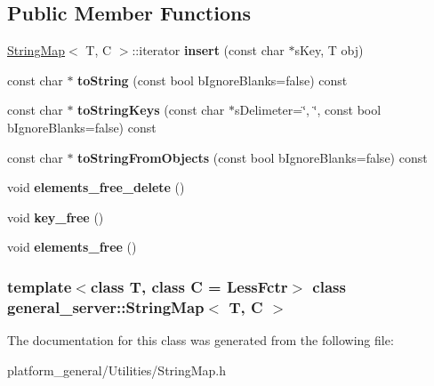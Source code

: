 \subsection*{\-Public \-Member \-Functions}
\begin{DoxyCompactItemize}
\item 
\hypertarget{classgeneral__server_1_1StringMap_aeafd999a8a89f51213e46fe9b78eda53}{\hyperlink{classgeneral__server_1_1StringMap}{\-String\-Map}$<$ \-T, \-C $>$\-::iterator {\bfseries insert} (const char $\ast$s\-Key, \-T obj)}\label{classgeneral__server_1_1StringMap_aeafd999a8a89f51213e46fe9b78eda53}

\item 
\hypertarget{classgeneral__server_1_1StringMap_a09a42eb44f1329b074239f7540073686}{const char $\ast$ {\bfseries to\-String} (const bool b\-Ignore\-Blanks=false) const }\label{classgeneral__server_1_1StringMap_a09a42eb44f1329b074239f7540073686}

\item 
\hypertarget{classgeneral__server_1_1StringMap_ae866721e728d45b969d30d9a79e62602}{const char $\ast$ {\bfseries to\-String\-Keys} (const char $\ast$s\-Delimeter=\char`\"{}, \char`\"{}, const bool b\-Ignore\-Blanks=false) const }\label{classgeneral__server_1_1StringMap_ae866721e728d45b969d30d9a79e62602}

\item 
\hypertarget{classgeneral__server_1_1StringMap_ad8d7e1fd25f63bb9559d1234bc34b632}{const char $\ast$ {\bfseries to\-String\-From\-Objects} (const bool b\-Ignore\-Blanks=false) const }\label{classgeneral__server_1_1StringMap_ad8d7e1fd25f63bb9559d1234bc34b632}

\item 
\hypertarget{classgeneral__server_1_1StringMap_ae161dc0edd948a5d6a4e393ed961a014}{void {\bfseries elements\-\_\-free\-\_\-delete} ()}\label{classgeneral__server_1_1StringMap_ae161dc0edd948a5d6a4e393ed961a014}

\item 
\hypertarget{classgeneral__server_1_1StringMap_a55c4f42af39cc1d23ac630f480ec9e60}{void {\bfseries key\-\_\-free} ()}\label{classgeneral__server_1_1StringMap_a55c4f42af39cc1d23ac630f480ec9e60}

\item 
\hypertarget{classgeneral__server_1_1StringMap_ac5b4a7b12a6d793141ff5cb93c3eb7de}{void {\bfseries elements\-\_\-free} ()}\label{classgeneral__server_1_1StringMap_ac5b4a7b12a6d793141ff5cb93c3eb7de}

\end{DoxyCompactItemize}
\subsubsection*{template$<$class \-T, class \-C = \-Less\-Fctr$>$ class general\-\_\-server\-::\-String\-Map$<$ T, C $>$}



\-The documentation for this class was generated from the following file\-:\begin{DoxyCompactItemize}
\item 
platform\-\_\-general/\-Utilities/\-String\-Map.\-h\end{DoxyCompactItemize}
